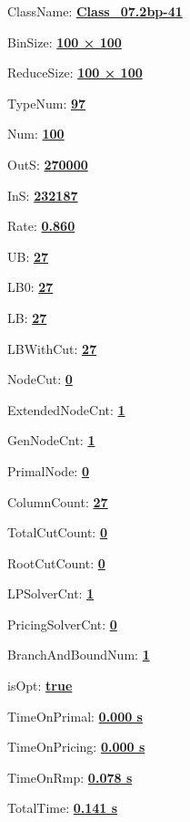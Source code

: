 \documentclass[11pt]{article}
\begin{document}
\pagestyle{empty}


ClassName: \underline{\textbf{Class_07.2bp-41}}
\par
BinSize: \underline{\textbf{100 × 100}}
\par
ReduceSize: \underline{\textbf{100 × 100}}
\par
TypeNum: \underline{\textbf{97}}
\par
Num: \underline{\textbf{100}}
\par
OutS: \underline{\textbf{270000}}
\par
InS: \underline{\textbf{232187}}
\par
Rate: \underline{\textbf{0.860}}
\par
UB: \underline{\textbf{27}}
\par
LB0: \underline{\textbf{27}}
\par
LB: \underline{\textbf{27}}
\par
LBWithCut: \underline{\textbf{27}}
\par
NodeCut: \underline{\textbf{0}}
\par
ExtendedNodeCnt: \underline{\textbf{1}}
\par
GenNodeCnt: \underline{\textbf{1}}
\par
PrimalNode: \underline{\textbf{0}}
\par
ColumnCount: \underline{\textbf{27}}
\par
TotalCutCount: \underline{\textbf{0}}
\par
RootCutCount: \underline{\textbf{0}}
\par
LPSolverCnt: \underline{\textbf{1}}
\par
PricingSolverCnt: \underline{\textbf{0}}
\par
BranchAndBoundNum: \underline{\textbf{1}}
\par
isOpt: \underline{\textbf{true}}
\par
TimeOnPrimal: \underline{\textbf{0.000 s}}
\par
TimeOnPricing: \underline{\textbf{0.000 s}}
\par
TimeOnRmp: \underline{\textbf{0.078 s}}
\par
TotalTime: \underline{\textbf{0.141 s}}
\par
\newpage


\end{document}
